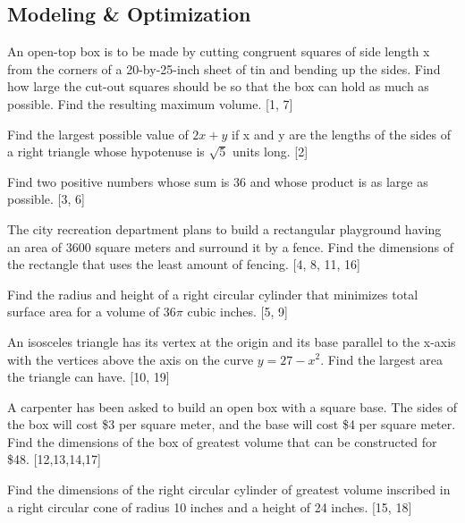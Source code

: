 \subsection*{Modeling \& Optimization}
\begin{questions}
    \question An open-top box is to be made by cutting congruent squares of side length x from the corners of a 20-by-25-inch sheet of tin and bending up the sides.  Find how large the cut-out squares should be so that the box can hold as much as possible.  Find the resulting maximum volume. [1, 7]
    
    
    \question Find the largest possible value of $2x+y$  if x and y are the lengths of the sides of a right triangle whose hypotenuse is $\sqrt{5}$ units long. [2]
    
    
    \newpage
    
    \question Find two positive numbers whose sum is 36 and whose product is as large as possible. [3, 6]

    \question The city recreation department plans to build a rectangular playground having an area of 3600 square meters and surround it by a fence.  Find the dimensions of the rectangle that uses the least amount of fencing.  [4, 8, 11, 16]

    \question Find the radius and height of a right circular cylinder that minimizes total surface area for a volume of $36\pi$ cubic inches.  [5, 9]
    
    \newpage
    
    \question An isosceles triangle has its vertex at the origin and its base parallel to the x-axis with the vertices above the axis on the curve $y=27-x^2$. Find the largest area the triangle can have. [10, 19]
    
    \question A carpenter has been asked to build an open box with a square base.  The sides of the box will cost \$3 per square meter, and the base will cost \$4 per square meter.  Find the dimensions of the box of greatest volume that can be constructed for \$48.  [12,13,14,17]
    
    \question Find the dimensions of the right circular cylinder of greatest volume inscribed in a right circular cone of radius 10 inches and a height of 24 inches.  [15, 18]
    
    
\end{questions}




\newpage
